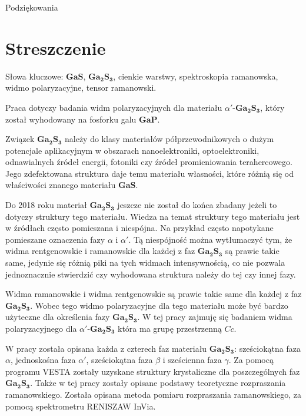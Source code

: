 Podziękowania

\newpage

\section*{Streszczenie}

Słowa kluczowe: $\mathbf{GaS}$, $\mathbf{Ga_{2}S_{3}}$, cienkie warstwy, spektroskopia ramanowska, widmo polaryzacyjne, tensor ramanowski.

\vspace{10mm}

Praca dotyczy badania widm polaryzacyjnych dla materiału $\alpha'$-$\mathbf{Ga_{2}S_{3}}$, który został wyhodowany na fosforku galu $\mathbf{GaP}$. 

Związek $\mathbf{Ga_{2}S_{3}}$ należy do klasy materiałów półprzewodnikowych o dużym potencjale aplikacyjnym w obszarach nanoelektroniki, optoelektroniki, odnawialnych źródeł energii, fotoniki czy źródeł promieniowania terahercowego. Jego zdefektowana struktura daje temu materiału własności, które różnią się od właściwości znanego materiału $\mathbf{GaS}$.

Do 2018 roku materiał $\mathbf{Ga_{2}S_{3}}$ jeszcze nie został do końca zbadany jeżeli to dotyczy struktury tego materiału. Wiedza na temat struktury tego materiału jest w źródłach często pomieszana i niespójna. Na przykład często napotykane pomieszane oznaczenia fazy $\alpha$ i $\alpha'$. Tą niespójność można wytłumaczyć tym, że widma rentgenowskie i ramanowskie dla każdej z faz $\mathbf{Ga_{2}S_{3}}$ są prawie takie same, jedynie się różnią piki na tych widmach intensywnością, co nie pozwala jednoznacznie stwierdzić czy wyhodowana struktura należy do tej czy innej fazy.

Widma ramanowskie i widma rentgenowskie są prawie takie same dla każdej z faz $\mathbf{Ga_{2}S_{3}}$. Wobec tego widmo polaryzacyjne dla tego materiału może być bardzo użyteczne dla określenia fazy $\mathbf{Ga_{2}S_{3}}$. W tej pracy zajmuję się badaniem widma polaryzacyjnego dla $\alpha'$-$\mathbf{Ga_{2}S_{3}}$ która ma grupę przestrzenną $Cc$.

W pracy została opisana każda z czterech faz materiału $\mathbf{Ga_{2}S_{3}}$: sześciokątna faza $\alpha$, jednoskośna faza $\alpha'$, sześciokątna faza $\beta$ i sześcienna faza $\gamma$. Za pomocą programu VESTA zostały uzyskane struktury krystaliczne dla poszczególnych faz $\mathbf{Ga_{2}S_{3}}$. Także w tej pracy zostały opisane podstawy teoretyczne rozpraszania ramanowskiego. Została opisana metoda pomiaru rozpraszania ramanowskiego, za pomocą spektrometru RENISZAW InVia.

